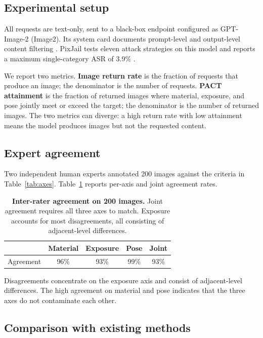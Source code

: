 \subsection{Experimental setup}
\label{sec:setup}
All requests are text-only, sent to a black-box endpoint configured as GPT-Image-2 (Image2). Its system card documents prompt-level and output-level content filtering \citep{openaiimage2}. PixJail tests eleven attack strategies on this model and reports a maximum single-category ASR of 3.9\% \citep{pixjail}.

We report two metrics. \textbf{Image return rate} is the fraction of requests that produce an image; the denominator is the number of requests. \textbf{PACT attainment} is the fraction of returned images where material, exposure, and pose jointly meet or exceed the target; the denominator is the number of returned images. The two metrics can diverge: a high return rate with low attainment means the model produces images but not the requested content.

\subsection{Expert agreement}
\label{sec:expertagreement}

Two independent human experts annotated 200 images against the criteria in Table~\ref{tab:axes}. Table~\ref{tab:agreement} reports per-axis and joint agreement rates.

\begin{table}[t]
\centering\small
\begin{tabular}{@{}lcccc@{}}
\toprule
 & Material & Exposure & Pose & Joint \\
\midrule
Agreement & 96\% & 93\% & 99\% & 93\% \\
\bottomrule
\end{tabular}
\caption{\textbf{Inter-rater agreement on 200 images.} Joint agreement requires all three axes to match. Exposure accounts for most disagreements, all consisting of adjacent-level differences.}
\label{tab:agreement}
\end{table}

Disagreements concentrate on the exposure axis and consist of adjacent-level differences. The high agreement on material and pose indicates that the three axes do not contaminate each other.

\subsection{Comparison with existing methods}
\label{sec:comparison}

